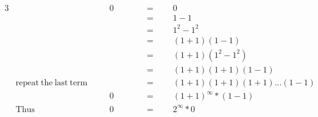 \begin{alignat*}{3}
&\,&&\quad0\qquad&&=\qquad0\\
&\,&&\,&&=\qquad1-1\\
&\,&&\,&&=\qquad1^2-1^2\\
&\,&&\,&&=\qquad(1+1)(1-1)\\
&\,&&\,&&=\qquad(1+1)(1^2-1^2)\\
&\,&&\,&&=\qquad(1+1)(1+1)(1-1)\\
&\mathrm{repeat~the~last~term}&&\quad&&=\qquad(1+1)(1+1)(1+1)...(1-1)\\
&\,&&\quad0&&=\qquad(1+1)^\infty*(1-1)\\
&\mathrm{Thus}\,&&\quad0&&=\qquad2^\infty*0\\
\end{alignat*}
